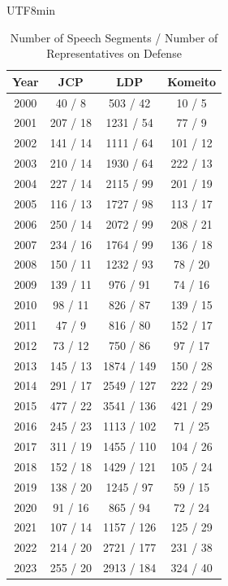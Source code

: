 \documentclass[final,5p,times,twocolumn,authoryear]{elsarticle}
\begin{document}
\begin{table}[h]
\begin{CJK}{UTF8}{min}

    \centering
    \begin{tabular}{c|ccc}
        \hline
        Year & JCP & LDP & Komeito \\
        \hline
        2000 & 40 / 8 & 503 / 42 & 10 / 5 \\
        2001 & 207 / 18 & 1231 / 54 & 77 / 9 \\
        2002 & 141 / 14 & 1111 / 64 & 101 / 12 \\
        2003 & 210 / 14 & 1930 / 64 & 222 / 13 \\
        2004 & 227 / 14 & 2115 / 99 & 201 / 19 \\
        2005 & 116 / 13 & 1727 / 98 & 113 / 17 \\
        2006 & 250 / 14 & 2072 / 99 & 208 / 21 \\
        2007 & 234 / 16 & 1764 / 99 & 136 / 18 \\
        2008 & 150 / 11 & 1232 / 93 & 78 / 20 \\
        2009 & 139 / 11 & 976 / 91 & 74 / 16 \\
        2010 & 98 / 11 & 826 / 87 & 139 / 15 \\
        2011 & 47 / 9 & 816 / 80 & 152 / 17 \\
        2012 & 73 / 12 & 750 / 86 & 97 / 17 \\
        2013 & 145 / 13 & 1874 / 149 & 150 / 28 \\
        2014 & 291 / 17 & 2549 / 127 & 222 / 29 \\
        2015 & 477 / 22 & 3541 / 136 & 421 / 29 \\
        2016 & 245 / 23 & 1113 / 102 & 71 / 25 \\
        2017 & 311 / 19 & 1455 / 110 & 104 / 26 \\
        2018 & 152 / 18 & 1429 / 121 & 105 / 24 \\
        2019 & 138 / 20 & 1245 / 97 & 59 / 15 \\
        2020 & 91 / 16 & 865 / 94 & 72 / 24 \\
        2021 & 107 / 14 & 1157 / 126 & 125 / 29 \\
        2022 & 214 / 20 & 2721 / 177 & 231 / 38 \\
        2023 & 255 / 20 & 2913 / 184 & 324 / 40 \\
        \hline
    \end{tabular}
    \caption{Number of Speech Segments / Number of Representatives on Defense}
    \label{tab:defense_speech}
	\end{CJK}
\end{table}
\end{document}
